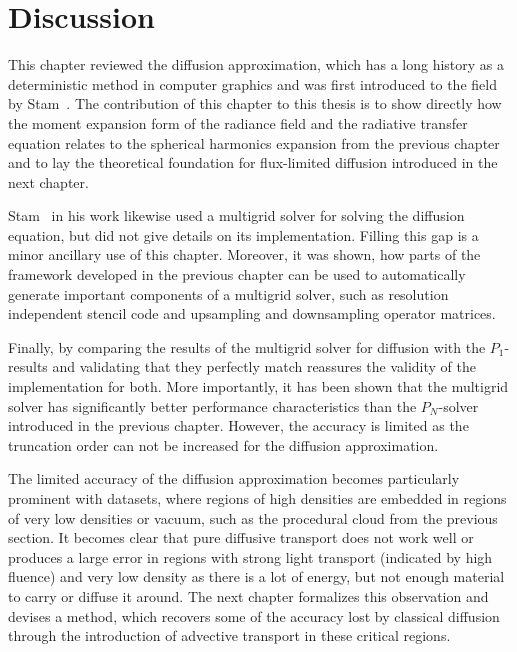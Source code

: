 \section{Discussion}
\label{sec:da_discussion}

This chapter reviewed the diffusion approximation, which has a long history as a deterministic method in computer graphics and was first introduced to the field by Stam~\cite{Stam95}. The contribution of this chapter to this thesis is to show directly how the moment expansion form of the radiance field and the radiative transfer equation relates to the spherical harmonics expansion from the previous chapter and to lay the theoretical foundation for flux-limited diffusion introduced in the next chapter.

Stam~\cite{Stam95} in his work likewise used a multigrid solver for solving the diffusion equation, but did not give details on its implementation. Filling this gap is a minor ancillary use of this chapter. Moreover, it was shown, how parts of the framework developed in the previous chapter can be used to automatically generate important components of a multigrid solver, such as resolution independent stencil code and upsampling and downsampling operator matrices.

Finally, by comparing the results of the multigrid solver for diffusion with the $P_1$-results and validating that they perfectly match reassures the validity of the implementation for both. More importantly, it has been shown that the multigrid solver has significantly better performance characteristics than the $P_N$-solver introduced in the previous chapter. However, the accuracy is limited as the truncation order can not be increased for the diffusion approximation.


The limited accuracy of the diffusion approximation becomes particularly prominent with datasets, where regions of high densities are embedded in regions of very low densities or vacuum, such as the procedural cloud from the previous section. It becomes clear that pure diffusive transport does not work well or produces a large error in regions with strong light transport (indicated by high fluence) and very low density as there is a lot of energy, but not enough material to carry or diffuse it around. The next chapter formalizes this observation and devises a method, which recovers some of the accuracy lost by classical diffusion through the introduction of advective transport in these critical regions.